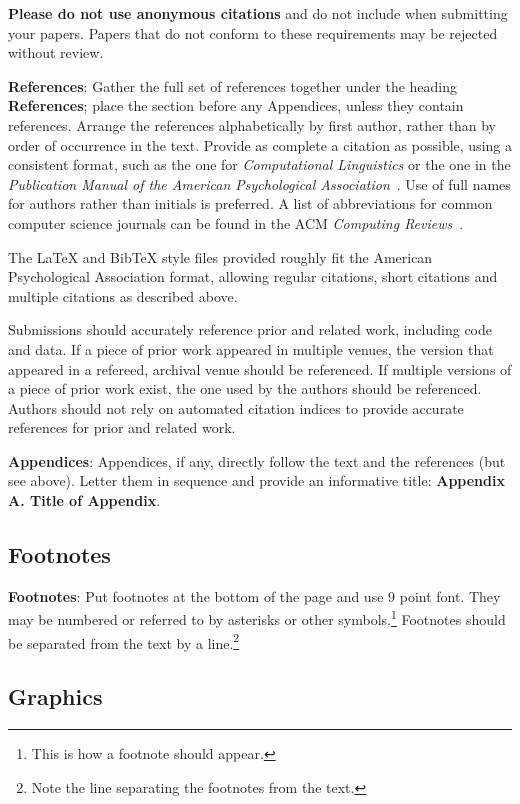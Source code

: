 \documentclass[11pt,a4paper]{article}
\begin{document}
\textbf{Please do not use anonymous citations} and do not include
 when submitting your papers. Papers that do not
conform to these requirements may be rejected without review.

\textbf{References}: Gather the full set of references together under
the heading {\bf References}; place the section before any Appendices,
unless they contain references. Arrange the references alphabetically
by first author, rather than by order of occurrence in the text.
Provide as complete a citation as possible, using a consistent format,
such as the one for {\em Computational Linguistics\/} or the one in the 
{\em Publication Manual of the American 
Psychological Association\/}~\cite{APA:83}. Use of full names for
authors rather than initials is preferred. A list of abbreviations
for common computer science journals can be found in the ACM 
{\em Computing Reviews\/}~\cite{ACM:83}.

The \LaTeX{} and Bib\TeX{} style files provided roughly fit the
American Psychological Association format, allowing regular citations, 
short citations and multiple citations as described above.

Submissions should accurately reference prior and related work, including code and data. If a piece of prior work appeared in multiple venues, the version that appeared in a refereed, archival venue should be referenced. If multiple versions of a piece of prior work exist, the one used by the authors should be referenced. Authors should not rely on automated citation indices to provide accurate references for prior and related work.

{\bf Appendices}: Appendices, if any, directly follow the text and the
references (but see above).  Letter them in sequence and provide an
informative title: {\bf Appendix A. Title of Appendix}.

\subsection{Footnotes}

{\bf Footnotes}: Put footnotes at the bottom of the page and use 9
point font. They may be numbered or referred to by asterisks or other
symbols.\footnote{This is how a footnote should appear.} Footnotes
should be separated from the text by a line.\footnote{Note the line
separating the footnotes from the text.}

\subsection{Graphics}
\end{document}
